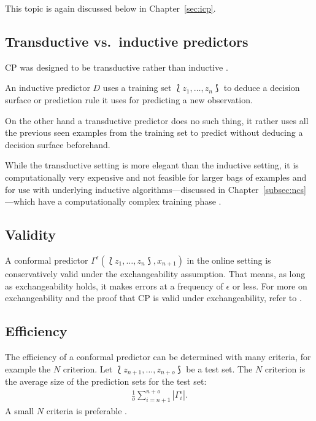 \documentclass[twoside,11pt]{article}
\begin{document}
This topic is again discussed below in
Chapter~\ref{sec:icp}.

\subsection*{Transductive vs.\ inductive predictors}

CP was designed to be transductive rather than inductive
\citep[see][Chapter 1]{alrw}.

An inductive predictor $D$ uses a training set
$\Lbag z_1,\dots,z_n \Rbag$ to deduce a decision surface
or prediction rule it uses for predicting a new
observation.

On the other hand a transductive predictor does no such
thing, it rather uses all the previous seen examples from
the training set to predict without deducing a decision
surface beforehand.

While the transductive setting is more elegant than the
inductive setting, it is computationally very expensive and
not feasible for larger bags of examples and for use with
underlying inductive algorithms---discussed in
Chapter~\ref{subsec:ncs}---which have a computationally
complex training phase
\citep[see][Chapter 1]{papadopoulos_et_al_2007, alrw}.

\subsection*{Validity}

A conformal predictor
$\Gamma^\epsilon(\Lbag z_1,\dots,z_n \Rbag, x_{n+1})$
in the online setting is conservatively valid under the
exchangeability assumption.
That means, as long as exchangeability holds, it makes
errors at a frequency of $\epsilon$ or less.
For more on exchangeability and the proof that CP is valid
under exchangeability, refer to
\citet[][Chapters 1--4, 7]{alrw}.

\subsection*{Efficiency}

The efficiency of a conformal predictor can be determined
with many criteria, for example the $N$ criterion.
Let $\Lbag z_{n+1},\dots,z_{n+o} \Rbag$ be a test set.
The $N$ criterion is the average size of the prediction
sets for the test set:
\begin{align*}
  \frac{1}{o}\sum^{n+o}_{i=n+1}|\Gamma^{\epsilon}_i|.
\end{align*}
A small $N$ criteria is preferable
\citep[see][]{vovk_et_al_2016}.
\end{document}

